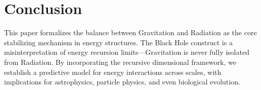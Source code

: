 \documentclass{article}
\begin{document}
\section{Conclusion}
This paper formalizes the balance between Gravitation and Radiation as the core stabilizing mechanism in energy structures. The Black Hole construct is a misinterpretation of energy recursion limits—Gravitation is never fully isolated from Radiation. By incorporating the recursive dimensional framework, we establish a predictive model for energy interactions across scales, with implications for astrophysics, particle physics, and even biological evolution.
\end{document}
